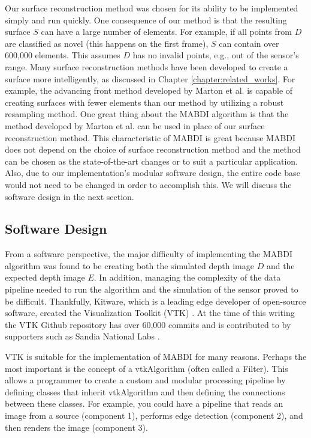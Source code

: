 Our surface reconstruction method was chosen for its ability to be implemented
simply and run quickly. One consequence of our method is that the resulting
surface $S$ can have a large number of elements. For example, if all points from
$D$ are classified as novel (this happens on the first frame), $S$ can contain
over 600,000 elements. This assumes $D$ has no invalid points, e.g., out of the
sensor's range. Many surface reconstruction methods have been developed to
create a surface more intelligently, as discussed in Chapter
\ref{chapter:related_works}. For example, the advancing front method developed
by Marton et al. \cite{Marton2009} is capable of creating surfaces with fewer
elements than our method by utilizing a robust resampling method. One great
thing about the MABDI algorithm is that the method developed by Marton et al.
can be used in place of our surface reconstruction method. This characteristic
of MABDI is great because MABDI does not depend on the choice of surface
reconstruction method and the method can be chosen as the state-of-the-art
changes or to suit a particular application. Also, due to our implementation's
modular software design, the entire code base would not need to be changed in
order to accomplish this. We will discuss the software design in the next
section.

\subsection{Software Design}

From a software perspective, the major difficulty of implementing the MABDI
algorithm was found to be creating both the simulated depth image $D$ and the
expected depth image $E$. In addition, managing the complexity of the data
pipeline needed to run the algorithm and the simulation of the sensor proved to
be difficult. Thankfully, Kitware, which is a leading edge developer of
open-source software, created the Visualization Toolkit (VTK)
\cite{schroeder2004visualization, sitevtk}. At the time of this writing the VTK
Github repository has over 60,000 commits and is contributed to by supporters
such as Sandia National Labs \cite{sitesandia}.

VTK is suitable for the implementation of MABDI for many reasons. Perhaps
the most important is the concept of a vtkAlgorithm (often called a Filter).
This allows a programmer to create a custom and modular processing pipeline by
defining classes that inherit vtkAlgorithm and then defining the connections
between these classes. For example, you could have a pipeline that reads an
image from a source (component 1), performs edge detection (component 2), and
then renders the image (component 3).

